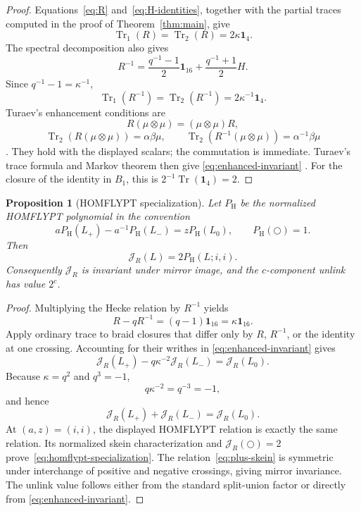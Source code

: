 \documentclass[11pt]{article}
\newtheorem{proposition}[theorem]{Proposition}
\theoremstyle{remark}
\newcommand{\Id}{\mathbf 1}
\newcommand{\Tr}{\operatorname{Tr}}
\begin{document}
\begin{proof}
Equations~\eqref{eq:R} and~\eqref{eq:H-identities}, together with the partial
traces computed in the proof of Theorem~\ref{thm:main}, give
\[
  \Tr_1(R)=\Tr_2(R)=2\kappa\Id_4.
\]
The spectral decomposition also gives
\[
  R^{-1}=\frac{q^{-1}-1}{2}\Id_{16}
         +\frac{q^{-1}+1}{2}H.
\]
Since \(q^{-1}-1=\kappa^{-1}\),
\[
  \Tr_1(R^{-1})=\Tr_2(R^{-1})=2\kappa^{-1}\Id_4.
\]
Turaev's enhancement conditions are
\[
  R(\mu\otimes\mu)=(\mu\otimes\mu)R,
\]
\[
  \Tr_2(R(\mu\otimes\mu))=\alpha\beta\mu,
  \qquad
  \Tr_2(R^{-1}(\mu\otimes\mu))=\alpha^{-1}\beta\mu
\]
\cite[\S\S2.2--2.3]{Turaev1988}.  They hold with the displayed scalars; the
commutation is immediate.  Turaev's trace formula and Markov theorem then give
\eqref{eq:enhanced-invariant}
\cite[\S\S3.1--3.2, especially Theorem~3.1.2]{Turaev1988}.  For the closure of the identity in
\(B_1\), this is \(2^{-1}\Tr(\Id_4)=2\).
\end{proof}

\begin{proposition}[HOMFLYPT specialization]\label{prop:homflypt}
Let \(P_{\mathrm H}\) be the normalized HOMFLYPT polynomial in the convention
\[
  aP_{\mathrm H}(L_+)-a^{-1}P_{\mathrm H}(L_-)
  =zP_{\mathrm H}(L_0),
  \qquad P_{\mathrm H}(\bigcirc)=1.
\]
Then
\begin{equation}
  \mathcal J_R(L)=2P_{\mathrm H}(L;i,i).
  \label{eq:homflypt-specialization}
\end{equation}
Consequently \(\mathcal J_R\) is invariant under mirror image, and the
\(c\)-component unlink has value \(2^c\).
\end{proposition}

\begin{proof}
Multiplying the Hecke relation by \(R^{-1}\) yields
\begin{equation}
  R-qR^{-1}=(q-1)\Id_{16}=\kappa\Id_{16}.
  \label{eq:matrix-skein}
\end{equation}
Apply ordinary trace to braid closures that differ only by \(R\), \(R^{-1}\),
or the identity at one crossing.  Accounting for their writhes in
\eqref{eq:enhanced-invariant} gives
\[
  \mathcal J_R(L_+)-q\kappa^{-2}\mathcal J_R(L_-)
  =\mathcal J_R(L_0).
\]
Because \(\kappa=q^2\) and \(q^3=-1\),
\[
  q\kappa^{-2}=q^{-3}=-1,
\]
and hence
\begin{equation}
  \mathcal J_R(L_+)+\mathcal J_R(L_-)=\mathcal J_R(L_0).
  \label{eq:plus-skein}
\end{equation}
At \((a,z)=(i,i)\), the displayed HOMFLYPT relation is exactly the same
relation.  Its normalized skein characterization and
\(\mathcal J_R(\bigcirc)=2\) prove~\eqref{eq:homflypt-specialization}.  The
relation~\eqref{eq:plus-skein} is symmetric under interchange of positive and
negative crossings, giving mirror invariance.  The unlink value follows either
from the standard split-union factor or directly from
\eqref{eq:enhanced-invariant}.
\end{proof}
\end{document}
